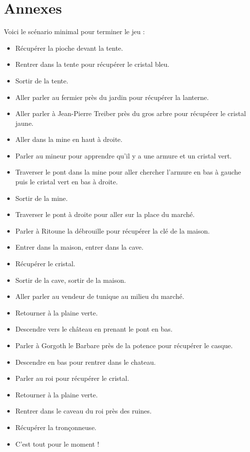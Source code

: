 \documentclass[a4paper]{article}
\begin{document}
\section{Annexes}
Voici le scénario minimal pour terminer le jeu :
\newline
\begin{itemize}
\item Récupérer la pioche devant la tente.
\item Rentrer dans la tente pour récupérer le cristal bleu.
\item Sortir de la tente.
\item Aller parler au fermier près du jardin pour récupérer la lanterne.
\item Aller parler à Jean-Pierre Treiber près du gros arbre pour récupérer le cristal jaune.
\item Aller dans la mine en haut à droite.
\item Parler au mineur pour apprendre qu'il y a une armure et un cristal vert.
\item Traverser le pont dans la mine pour aller chercher l'armure en bas à gauche puis le cristal vert en bas à droite.
\item Sortir de la mine.
\item Traverser le pont à droite pour aller sur la place du marché.
\item Parler à Ritoune la débrouille pour récupérer la clé de la maison.
\item Entrer dans la maison, entrer dans la cave.
\item Récupérer le cristal.
\item Sortir de la cave, sortir de la maison.
\item Aller parler au vendeur de tunique au milieu du marché.
\item Retourner à la plaine verte.
\item Descendre vers le château en prenant le pont en bas. 
\item Parler à Gorgoth le Barbare près de la potence pour récupérer le casque.
\item Descendre en bas pour rentrer dans le chateau.
\item Parler au roi pour récupérer le cristal.
\item Retourner à la plaine verte.
\item Rentrer dans le caveau du roi près des ruines.
\item Récupérer la tronçonneuse.
\item C'est tout pour le moment !
\end{itemize}
\end{document}
